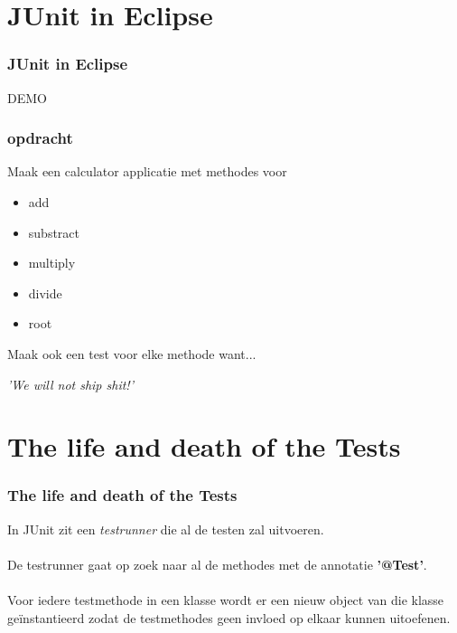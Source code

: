 \documentclass{beamer}
\begin{document}
\section{JUnit in Eclipse}

\begin{frame}

\frametitle{JUnit in Eclipse}

\begin{center}
{\huge DEMO}
\end{center}

\end{frame}


\begin{frame}

\frametitle{opdracht}

\begin{center}
{\Large Maak een calculator applicatie met methodes voor}
\end{center}

\begin{itemize}
\item {\Large add}
\item {\Large substract}
\item {\Large multiply}
\item {\Large divide}
\item {\Large root}
\end{itemize}

\begin{center}
{\Large Maak ook een test voor elke methode want...}
\end{center}

% 
% 

\begin{center}
\textit{{\LARGE 'We will not ship shit!'}}
\end{center}

\end{frame}


\section{The life and death of the Tests}


\begin{frame}

\frametitle{The life and death of the Tests}

{\Large In JUnit zit een \textit{testrunner} die al de testen zal uitvoeren.\\~\\
De testrunner gaat op zoek naar al de methodes met de annotatie \textbf{'@Test'}.\\~\\
Voor iedere testmethode in een klasse wordt er een nieuw object van die klasse 
ge\"instantieerd zodat de testmethodes geen invloed op elkaar kunnen uitoefenen.}

\end{frame}
\end{document}
